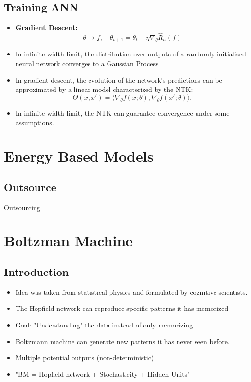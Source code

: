 \documentclass{antclass}
\begin{document}
\section{Training ANN}
\begin{itemize}
	
\item \textbf{Gradient Descent:}
\[
\theta\to f, \quad \theta_{t+1} = \theta_t - \eta \nabla_\theta \hat{R}_n(f)
\]


\item In infinite-width limit, the distribution over outputs of a randomly initialized neural network converges to a Gaussian Process%
\item In gradient descent, the evolution of the network’s predictions can be approximated by a linear model characterized by the NTK:
\[
\Theta(x,x') = \langle \nabla_\theta f(x;\theta), \nabla_\theta f(x';\theta) \rangle.
\]
\item In infinite-width limit, the NTK can guarantee convergence under some assumptions.
\end{itemize}
 





\chapter{Energy Based Models}
\section{Outsource}

Outsourcing

\chapter{Boltzman Machine}
\section{Introduction}
\begin{itemize}
 	\item Idea was taken from statistical physics and formulated by cognitive scientists.
	
	\item The Hopfield network can reproduce specific patterns it has memorized
 	
 	\item Goal: "Understanding" the data instead of only memorizing
 	
 	\item Boltzmann machine can generate new patterns it has never seen before.
 	\item Multiple potential outputs (non-deterministic)
 	
 	\item "BM = Hopfield network + Stochasticity + Hidden Units"

 
\end{itemize}
\end{document}
